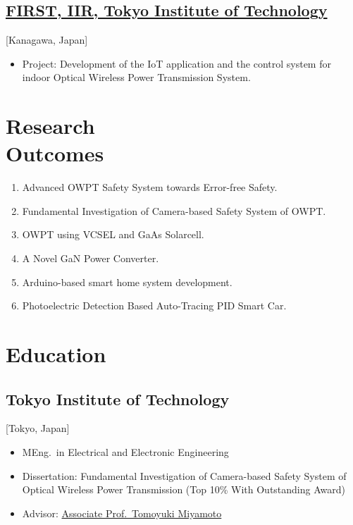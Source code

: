 \documentclass{mycv}
\begin{document}
\subsection{\href{https://www.iir.titech.ac.jp/en/}{FIRST, IIR, Tokyo Institute of Technology}}[Kanagawa, Japan]
\begin{positions}
\end{positions}
\begin{itemize}
	\item Project: Development of the IoT application and the control system for indoor Optical Wireless Power Transmission System. 
\end{itemize}



\section{Research \\ Outcomes}

\begin{enumerate}
  \item Advanced OWPT Safety System towards Error-free Safety. 
  \item Fundamental Investigation of Camera-based Safety System of OWPT. 
  \item OWPT using VCSEL and GaAs Solarcell. 
  \item A Novel GaN Power Converter. 
  \item Arduino-based smart home system development. 
  \item Photoelectric Detection Based Auto-Tracing PID Smart Car. 
\end{enumerate}

\section{Education}

\subsection{Tokyo Institute of Technology}[Tokyo, Japan]
\vspace{-\parskip}%
\begin{itemize}[label={}]	
  \item MEng.\ in Electrical and Electronic Engineering 
  \item Dissertation: {Fundamental Investigation of Camera-based Safety System of Optical Wireless Power Transmission} (Top 10\% With Outstanding Award)%
  \item Advisor: \href{https://www.first.iir.titech.ac.jp/member/core3.html#miyamoto}{Associate Prof.~Tomoyuki Miyamoto}
\end{itemize}
\end{document}

